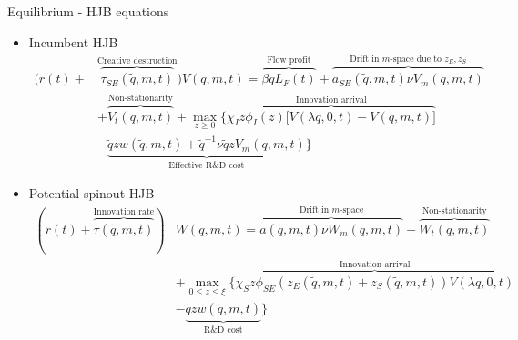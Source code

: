 \documentclass[english,usenames,dvipsnames]{beamer}
\begin{document}
\begin{frame}{Equilibrium - HJB equations}
\begin{itemize}
	\item Incumbent HJB
	\footnotesize
	\begin{align*}
	(r(t) + &\overbrace{\tau_{SE}(\tilde{q},m,t)}^{\textrm{Creative destruction}}) V(q,m,t) = \overbrace{\beta q L_F(t)}^{\textrm{Flow profit}} + \overbrace{a_{SE}(\tilde{q},m,t) \nu V_m(q,m,t)}^{\textrm{Drift in $m$-space due to $z_E,z_S$}} \\
	& + \overbrace{V_t(q,m,t)}^{\textrm{Non-stationarity}} + \max_{z \ge 0} \Big \{ \overbrace{\chi_I z \phi_I(z)\big[V(\lambda q,0,t) - V(q,m,t) \big] }^{\textrm{Innovation arrival}}\\
	& - \underbrace{\tilde{q}z w(\tilde{q},m,t) + \tilde{q}^{-1} \nu \tilde{q} z V_m(q,m,t)}_{\textrm{Effective R\&D cost}}\Big\}
	\end{align*}
	\normalsize
	\item Potential spinout HJB
	\footnotesize
	\begin{align*}
	(r(t) + \overbrace{\tau(\tilde{q},m,t)}^{\textrm{Innovation rate}}) &W(q,m,t) = \overbrace{a(\tilde{q},m,t) \nu W_m(q,m,t)}^{\textrm{Drift in $m$-space}} + \overbrace{W_t(q,m,t)}^{\textrm{Non-stationarity}} \\
	&+ \max_{0 \le z \le \xi} \Big \{ \overbrace{\chi_S z \phi_{SE}(z_E(\tilde{q},m,t) + z_S(\tilde{q},m,t)) V(\lambda q,0,t)}^{\textrm{Innovation arrival}} \\
	& - \underbrace{\tilde{q}z w(\tilde{q},m,t)}_{\textrm{R\&D cost}}\Big\}
	\end{align*}
\end{itemize}
\end{frame}
\end{document}
